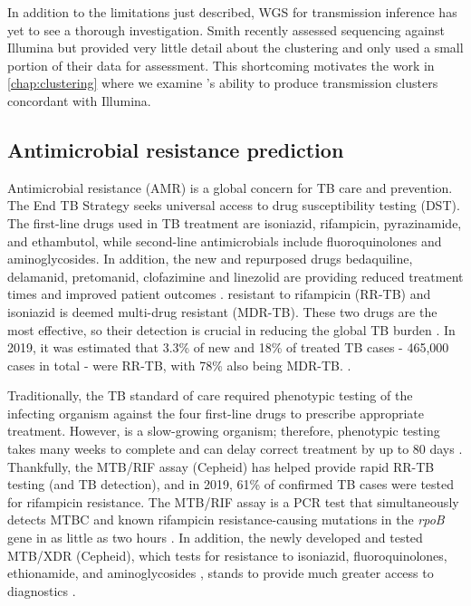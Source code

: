 In addition to the limitations just described, \ont{} WGS for transmission inference has yet to see a thorough investigation. Smith \etal{} recently assessed \ont{} sequencing against Illumina but provided very little detail about the clustering and only used a small portion of their data for assessment. This shortcoming motivates the work in \autoref{chap:clustering} where we examine \ont{}'s ability to produce transmission clusters concordant with Illumina.

\subsection{Antimicrobial resistance prediction}
\label{sec:amr}

Antimicrobial resistance (AMR) is a global concern for TB care and prevention. The End TB Strategy seeks universal access to drug susceptibility testing (DST). The first-line drugs used in TB treatment are isoniazid, rifampicin, pyrazinamide, and ethambutol, while second-line antimicrobials include fluoroquinolones and aminoglycosides. In addition, the new and repurposed drugs bedaquiline, delamanid, pretomanid, clofazimine and linezolid are providing reduced treatment times and improved patient outcomes \cite{Kadura2020}. \mtb{} resistant to rifampicin (RR-TB) and isoniazid is deemed multi-drug resistant (MDR-TB). These two drugs are the most effective, so their detection is crucial in reducing the global TB burden \cite{who2020}. In 2019, it was estimated that 3.3\% of new and 18\% of treated TB cases - 465,000 cases in total - were RR-TB, with 78\% also being MDR-TB. \cite{who2020}.

Traditionally, the TB standard of care required phenotypic testing of the infecting organism against the four first-line drugs to prescribe appropriate treatment. However, \mtb{} is a slow-growing organism; therefore, phenotypic testing takes many weeks to complete and can delay correct treatment by up to 80 days \cite{Pankhurst2016}. Thankfully, the \xpert{} MTB/RIF assay (Cepheid) has helped provide rapid RR-TB testing (and TB detection), and in 2019, 61\% of confirmed TB cases were tested for rifampicin resistance. The \xpert{} MTB/RIF assay is a PCR test that simultaneously detects MTBC and known rifampicin resistance-causing mutations in the \textit{rpoB} gene in as little as two hours \cite{Boehme2011}. In addition, the newly developed and tested \xpert{} MTB/XDR (Cepheid), which tests for resistance to isoniazid, fluoroquinolones, ethionamide, and aminoglycosides \cite{Cao2021}, stands to provide much greater access to diagnostics \cite{Bainomugisa2020}.


